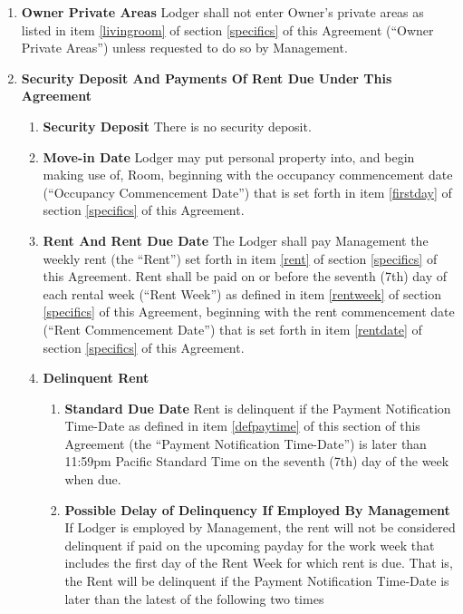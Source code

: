 \documentclass[12pt,letterpaper]{article}
\newcommand{\lodger}{Lodger}
\newcommand{\management}{Management}
\newcommand{\room}{Room}
\newcommand{\furniture}{Furniture, Kitchenware, Linen, etc.}
\newcommand{\livingroom}{Owner Private Areas}
\newcommand{\firstday}{Occupancy Commencement Date}
\newcommand{\rentdate}{Rent Commencement Date}
\newcommand{\rentweek}{Rent Week}
\newcommand{\paymenttime}{Payment Notification Time-Date}
\begin{document}
\begin{enumerate}
\begin{enumerate}
			\item \textbf{\furniture{}} \quad \management{} shall provide the \furniture{} listed in item \ref{furniture} of section \ref{specifics} of this Agreement{} (``\furniture{}'') in usable condition and maintain same in usable condition during the time \room{} is rented to \lodger{}.
		\end{enumerate}
	\item \textbf{\livingroom{}} \quad \lodger{} shall not enter Owner's private areas as listed in item \ref{livingroom} of section \ref{specifics} of this Agreement (``\livingroom{}'') unless requested to do so by \management{}.
	\item \textbf{Security Deposit And Payments Of Rent Due Under This Agreement} \quad 
		\begin{enumerate}
			\item \textbf{Security Deposit} \quad There is no security deposit. 
			\item \textbf{Move-in Date} \quad \lodger{} may put personal property into, and begin making use of, \room{}, beginning with the occupancy commencement date (``\firstday{}'') that is set forth in item \ref{firstday} of section \ref{specifics} of this Agreement.
			\item \textbf{Rent And Rent Due Date} \quad The \lodger{} shall pay \management{} the weekly rent (the ``Rent'') set forth in item \ref{rent} of section \ref{specifics} of this Agreement{}. Rent shall be paid on or before the seventh (7th) day of each rental week (``\rentweek{}'') as defined in item \ref{rentweek} of section \ref{specifics} of this Agreement, beginning with the rent commencement date (``\rentdate{}'') that is set forth in item \ref{rentdate} of section \ref{specifics} of this Agreement.
			\item \textbf{Delinquent Rent} \quad \label{due}
				\begin{enumerate}
					\item \textbf{Standard Due Date} \quad Rent is delinquent if the \paymenttime{} as defined in item \ref{defpaytime} of this section of this Agreement (the ``\paymenttime{}'') is later than 11:59pm Pacific Standard Time on the seventh (7th) day of the week when due. 
					\item \textbf{Possible Delay of Delinquency If Employed By Management} \quad If \lodger{} is employed by \management{}, the rent will not be considered delinquent if paid on the upcoming payday for the work week that includes the first day of the \rentweek{} for which rent is due. That is, the Rent will be delinquent if the \paymenttime{} is later than the latest of the following two times 

\end{enumerate}
\end{enumerate}
\end{enumerate}
\end{document}
